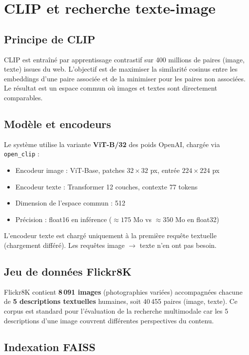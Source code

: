 \documentclass[12pt,a4paper]{report}
\begin{document}
\chapter{CLIP et recherche texte-image}

\section{Principe de CLIP}

CLIP \cite{radford2021} est entraîné par apprentissage contrastif sur 400 millions de paires (image, texte) issues du web. L'objectif est de maximiser la similarité cosinus entre les embeddings d'une paire associée et de la minimiser pour les paires non associées. Le résultat est un espace commun où images et textes sont directement comparables.

\section{Modèle et encodeurs}

Le système utilise la variante \textbf{ViT-B/32} des poids OpenAI, chargée via \texttt{open\_clip} :
\begin{itemize}
  \item Encodeur image : ViT-Base, patches $32 \times 32$ px, entrée $224 \times 224$ px
  \item Encodeur texte : Transformer 12 couches, contexte 77 tokens
  \item Dimension de l'espace commun : 512
  \item Précision : float16 en inférence ($\approx 175$ Mo vs $\approx 350$ Mo en float32)
\end{itemize}

L'encodeur texte est chargé uniquement à la première requête textuelle (chargement différé). Les requêtes image $\to$ texte n'en ont pas besoin.

\section{Jeu de données Flickr8K}

Flickr8K \cite{hodosh2013} contient \textbf{8\,091 images} (photographies variées) accompagnées chacune de \textbf{5 descriptions textuelles} humaines, soit 40\,455 paires (image, texte). Ce corpus est standard pour l'évaluation de la recherche multimodale car les 5 descriptions d'une image couvrent différentes perspectives du contenu.

\section{Indexation FAISS}
\end{document}
